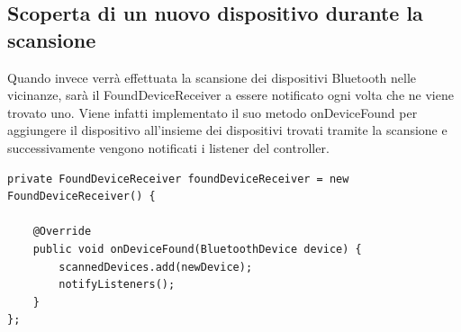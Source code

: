 \subsection{Scoperta di un nuovo dispositivo durante la scansione}
Quando invece verrà effettuata la scansione dei dispositivi Bluetooth nelle vicinanze, sarà il FoundDeviceReceiver a essere notificato ogni volta che ne viene trovato uno. Viene infatti implementato il suo metodo onDeviceFound per aggiungere il dispositivo all'insieme dei dispositivi trovati tramite la scansione e successivamente vengono notificati i listener del controller.
\begin{verbatim}
private FoundDeviceReceiver foundDeviceReceiver = new FoundDeviceReceiver() {

    @Override
    public void onDeviceFound(BluetoothDevice device) {
        scannedDevices.add(newDevice);
        notifyListeners();
    }
};
\end{verbatim}

